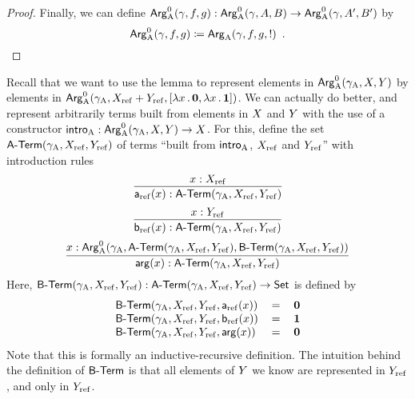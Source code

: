 \documentclass{article}
\begin{document}
\begin{proof}
  Finally, we can define $\ArgAp(\gamma, f, g) : \ArgAp(\gamma, A, B) \to
  \ArgAp(\gamma, A', B')$ by
  \[
  \ArgAp(\gamma, f, g) \coloneqq \ArgA(\gamma,f, g, \magicOmit{B'(f(\repA(x))) \to B'(\repA'(x))}) \enspace .
  \]
\end{proof}

Recall that we want to use the lemma to represent elements in
$\ArgAp(\gammaA, \A, \B)$ by elements in $\ArgAp(\gammaA, \Xref
+\Yref, [\lambda x\,.\,\zero, \lambda x\,.\,\one])$. We can actually
do better, and represent arbitrarily terms built from elements in $\A$
and $\B$ with the use of a constructor $\introA : \ArgAp(\gammaA, \A,
\B) \to \A$. For this, define the set $\Aterm(\gammaA, \Xref, \Yref)$
of terms ``built from $\introA$, $\Xref$ and $\Yref$'' with
introduction rules
%
\[
\infer{\termAref(x) : \Aterm(\gammaA, \Xref, \Yref)}{x : \Xref}
\]
%
%
\[
\infer{\termBref(x) : \Aterm(\gammaA, \Xref, \Yref)}{x : \Yref}
\]
%
%
\[
\infer{\termArg(x) : \Aterm(\gammaA, \Xref, \Yref)}{x : \ArgAp(\gammaA, \Aterm(\gammaA, \Xref, \Yref), \Bterm(\gammaA, \Xref, \Yref))}
\]
Here, $\Bterm(\gammaA, \Xref, \Yref) : \Aterm(\gammaA, \Xref, \Yref) \to \Set$ is defined by
\[
\begin{tabular}{lcr}
$\Bterm(\gammaA, \Xref, \Yref, \termAref(x))$ & $=$ & $\zero$ \\
$\Bterm(\gammaA, \Xref, \Yref, \termBref(x))$ & $=$ & $\one$  \\
$\Bterm(\gammaA, \Xref, \Yref, \termArg(x))$  & $=$ & $\zero$
\end{tabular}
\]
Note that this is formally an inductive-recursive definition.
The intuition behind the definition of $\Bterm$ is that all elements of
$\B$ we know are represented in $\Yref$, and only in $\Yref$. 
\end{document}
